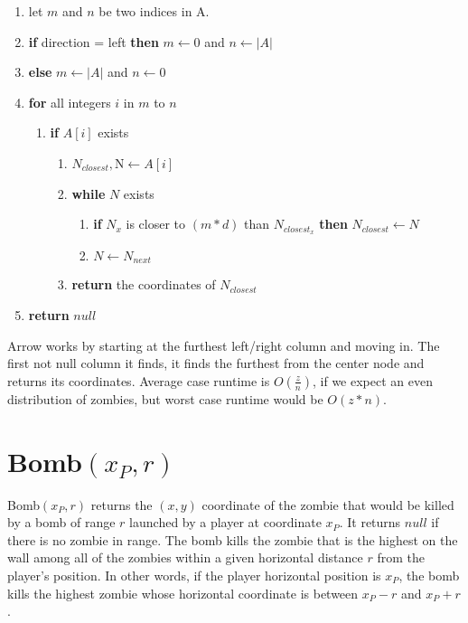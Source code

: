 \documentclass{article}
\begin{document}
\begin{enumerate}
    \item let $m$ and $n$ be two indices in A.
    \item \textbf{if} direction = left \textbf{then} $m \leftarrow 0$ and $n \leftarrow |A| $
    \item \textbf{else} $m \leftarrow |A|$ and $n \leftarrow 0$
    \item \textbf{for} all integers $i$ in $m$ to $n$
    \begin{enumerate}
        \item \textbf{if} $A[i]$ exists 
        \begin{enumerate}
            \item $N_{closest}, $N$ \leftarrow A[i]$
            \item \textbf{while} $N$ exists
            \begin{enumerate}
                \item \textbf{if} $N_x$ is closer to $(m*d)$ than $N_{closest_x}$ \textbf{then} $N_{closest} \leftarrow N$
                \item $N \leftarrow N_{next}$
            \end{enumerate}
            \item \textbf{return} the coordinates of $N_{closest}$
        \end{enumerate}
    \end{enumerate}
    \item \textbf{return} $null$
\end{enumerate}
Arrow works by starting at the furthest left/right column and moving in. The first not null column it finds, it finds the furthest from the center node and returns its coordinates. Average case runtime is $O(\frac{z}{n})$, if we expect an even distribution of zombies, but worst case runtime would be $O(z*n)$.

\section{Bomb$(x_P,r)$}
Bomb$(x_P, r)$ returns the $(x, y)$ coordinate of the zombie that would be killed by a bomb of range $r$ launched by a player at coordinate $x_P$. It returns $null$ if there is no zombie in range. The bomb  kills the zombie that is the highest on the  wall among all of the zombies within a given horizontal distance $r$ from the player’s position. In other words, if the player horizontal position is $x_P$, the bomb kills the highest zombie whose horizontal coordinate is between $x_P-r$ and $x_P+r$. 
\end{document}
